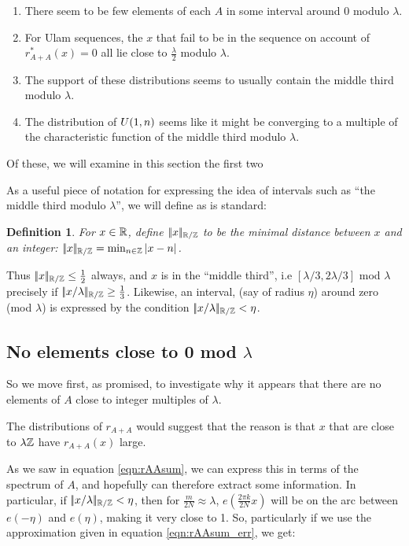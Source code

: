 \documentclass{report}
\newtheorem{definition}[theorem]{Definition}
\theoremstyle{remark}
\numberwithin{equation}{section}
\begin{document}
\begin{enumerate}
\item There seem to be few elements of each $A$ in some interval
  around 0 modulo $\lambda$.
\item For Ulam sequences, the $x$ that fail to be in the sequence on
  account of $r^*_{A+A}(x) = 0$ all lie close to $\frac\lambda2$
  modulo $\lambda$.  
\item The support of these distributions seems to usually contain the
  middle third modulo $\lambda$.  
\item The distribution of $U(1,n)$ seems like it might be
  converging to a multiple of the characteristic function of the
  middle third modulo $\lambda$.  
\end{enumerate}

Of these, we will examine in this section the first two

As a useful piece of notation for expressing the idea of intervals
such as ``the middle third modulo $\lambda$'', we will define as is
standard:

\begin{definition}
For $x \in \mathbb{R}$, define $|\!|x|\!|_{\mathbb{R}/\mathbb{Z}}$ to be the minimal distance between
$x$ and an integer: $|\!|x|\!|_{\mathbb{R}/\mathbb{Z}} = \min_{n \in \mathbb{Z}} |x-n|$.
\end{definition}

Thus $|\!|x|\!|_{\mathbb{R}/\mathbb{Z}} \leq \frac12$ always, and $x$ is in the ``middle
third'', i.e $[\lambda/3, 2\lambda/3]$ mod $\lambda$ precisely if
$|\!|x/\lambda|\!|_{\mathbb{R}/\mathbb{Z}} \geq \frac13$.  Likewise, an interval, (say of
radius $\eta$) around zero (mod $\lambda$) is expressed by the
condition $|\!|x/\lambda|\!|_{\mathbb{R}/\mathbb{Z}} < \eta$.  

\subsection{No elements close to 0 mod $\lambda$}

So we move first, as promised, to investigate why it appears that
there are no elements of $A$ close to integer multiples of $\lambda$.

The distributions of $r_{A+A}$ would suggest that the reason is that
$x$ that are close to $\lambda\mathbb{Z}$ have $r_{A+A}(x)$ large.  

As we saw in equation \ref{eqn:rAAsum}, we can express this in terms
of the spectrum of $A$, and hopefully can therefore extract some
information.  In particular, if $|\!|x/\lambda|\!|_{\mathbb{R}/\mathbb{Z}} < \eta$, then for
$\frac{m}{2N} \approx \lambda$, $e(\frac{2\pi k}{2N} x)$ will be on
the arc between $e(-\eta)$ and $e(\eta)$, making it very close to 1.
So, particularly if we use the approximation given in equation
\ref{eqn:rAAsum_err}, we get: 
\end{document}
